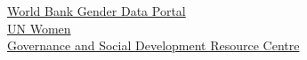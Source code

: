 \documentclass{article}
\begin{document}
\href{https://genderdata.worldbank.org/en/home}{World Bank Gender Data Portal} \\
\href{https://data.unwomen.org/}{UN Women} \\
\href{https://gsdrc.org/category/social-development/gender/womens-economic-participation/}{Governance and Social Development Resource Centre}
\end{document}
